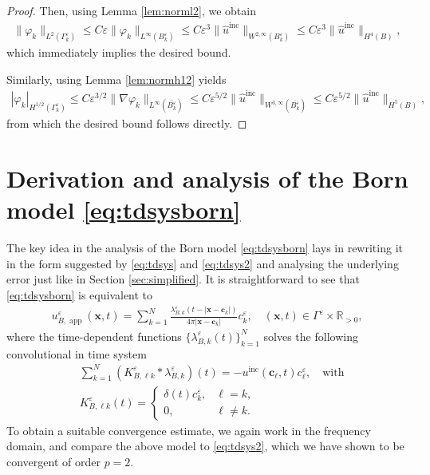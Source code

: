 \documentclass[]{article}
\numberwithin{equation}{section}
\numberwithin{theorem}{section}
\numberwithin{lemma}{section}
\numberwithin{corollary}{section}
\numberwithin{proposition}{section}
\numberwithin{definition}{section}
\newcommand{\bx}{\boldsymbol{x}}
\newcommand{\bc}{\boldsymbol{c}}
\newcommand{\re}{\varepsilon}
\renewcommand{\vec}{\boldsymbol}
\newcommand{\inc}{\operatorname{inc}}
\begin{document}
\begin{appendices}
\begin{proof}
			Then, using Lemma \ref{lem:norml2}, we obtain
			\begin{align*}
				\| \varphi_k \|_{L^2(\Gamma^{\re}_k)} \leq C \re \| \varphi_k \|_{L^{\infty}(B^{\re}_k)} \leq C \re^3 \| \hat{u}^{\inc} \|_{W^{2,\infty}(B^{\re}_k)} \leq C \re^3\| \hat{u}^{\inc} \|_{H^4(B)},
			\end{align*}
			which immediately implies the desired bound.
			
			Similarly, using Lemma \ref{lem:normh12} yields 
			\begin{align*}
				| \varphi_k |_{H^{1/2}(\Gamma^{\re}_k)} \leq C \re^{3/2} \| \nabla \varphi_k \|_{L^{\infty}(\overline{B^{\re}_k})} \leq  C \re^{5/2}  \|\hat{u}^{\inc}\|_{W^{3,\infty}(\overline{B^{\re}_k})} \leq  C\re^{5/2} \|\hat{u}^{\inc}\|_{H^5(B)}, 
			\end{align*}
			from which the desired bound follows directly.
		\end{proof}
		
		\section{Derivation and analysis of the Born model \eqref{eq:tdsysborn}}
		\label{app:born_analysis}
		The key idea in the analysis of the Born model \eqref{eq:tdsysborn} lays in rewriting it in the form suggested by \eqref{eq:tdsys} and \eqref{eq:tdsys2} and analysing the underlying error just like in Section \ref{sec:simplified}. It is straightforward to see that \eqref{eq:tdsysborn} is equivalent to
		\begin{align*}
			u^{\re}_{B, \operatorname{app}} (\bx, t) =\sum\limits_{k=1}^N \frac{\lambda_{B,k}^{\re}(t-|\vec{x}-\vec{c}_k|)}{4\pi|\vec{x}-\vec{c}_k|}c_k^{\re}, \quad (\bx, t) \in \Gamma^{\re} \times \mathbb{R}_{>0},
		\end{align*}
		where the time-dependent functions $\{ \lambda_{B,k}^{\re} (t) \}_{k=1}^N$ solves the following convolutional in time system  
		\begin{align}
			\label{eq:tdnewborn}
			&	\sum_{k=1}^{N}(K_{B,\ell k}^{\re}*\lambda_{B,k}^{\re})(t)=-u^{\operatorname{inc}}(\vec{c}_{\ell} , t)c_{\ell}^{\re}, \quad\text{with}\\
			&	K_{B,\ell k}^{\re}(t)= 
			\left\{
			\begin{array}{ll}
				\delta(t)c_k^{\re}, &\ell = k, \\
				0, & \ell \neq k.
			\end{array}
			\right.\nonumber
		\end{align}
		To obtain a suitable convergence estimate, we again work in the frequency domain, and compare the above model to \eqref{eq:tdsys2}, which we have shown to be convergent of order $p=2$.

\end{appendices}
\end{document}
